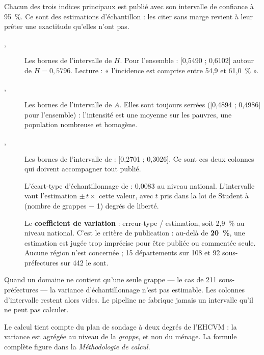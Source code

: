 \documentclass[11pt,a4paper]{article}
\begin{document}
Chacun des trois indices principaux est publié avec son intervalle de confiance à 95~\%. Ce sont
des estimations d'échantillon : les citer sans marge revient à leur prêter une exactitude qu'elles
n'ont pas.

\begin{description}
  \item[, ] Les bornes de l'intervalle de $H$. Pour l'ensemble :
  [0,5490 ; 0,6102] autour de $H = 0{,}5796$. Lecture : « l'incidence est comprise entre 54,9 et
  61,0~\% ».

  \item[, ] Les bornes de l'intervalle de $A$. Elles sont
  toujours serrées ([0,4894 ; 0,4986] pour l'ensemble) : l'intensité est une moyenne sur les
  pauvres, une population nombreuse et homogène.

  \item[, ] Les bornes de l'intervalle de \ipm{} :
  [0,2701 ; 0,3026]. Ce sont ces deux colonnes qui doivent accompagner tout \ipm{} publié.

  \item[] L'écart-type d'échantillonnage de \ipm{} : 0,0083 au niveau
  national. L'intervalle vaut l'estimation $\pm\, t \times$ cette valeur, avec $t$ pris dans la loi
  de Student à (nombre de grappes $-$ 1) degrés de liberté.

  \item[] Le \textbf{coefficient de variation} : erreur-type / estimation, soit
  2,9~\% au niveau national. C'est le critère de publication : au-delà de \textbf{20~\%}, une
  estimation est jugée trop imprécise pour être publiée ou commentée seule. Aucune région n'est
  concernée ; 15 départements sur 108 et 92 sous-préfectures sur 442 le sont.
\end{description}

\begin{attention}
Quand un domaine ne contient qu'une seule grappe --- le cas de 211 sous-préfectures --- la
variance d'échantillonnage n'est pas estimable. Les colonnes d'intervalle restent alors vides. Le
pipeline ne fabrique jamais un intervalle qu'il ne peut pas calculer.
\end{attention}

Le calcul tient compte du plan de sondage à deux degrés de l'EHCVM : la variance est agrégée au
niveau de la \emph{grappe}, et non du ménage. La formule complète figure dans la \emph{Méthodologie
de calcul}.
\end{document}
